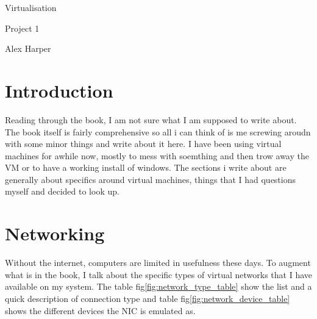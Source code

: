 \documentclass[12pt]{article}
\begin{document}
\begin{titlepage}
	\centering
	{\Huge Virtualisation\par}
	\vspace{0.25in}
	{\Large Project 1\par}
	\vspace{2in}
	{Alex Harper\par}
	\newpage
\end{titlepage}

\tableofcontents
\newpage

\listoffigures
\newpage
\setlength{\parindent}{4em} %
\setlength{\parskip}{1em} %


\section{Introduction}

Reading through the book, I am not sure what I am supposed to write about.
The book itself is fairly comprehensive so all i can think of is me screwing aroudn with some minor things and write about it here.
I have been using virtual machines for awhile now, mostly to mess with soemthing and then trow away the VM or to have a working install of windows.
The sections i write about are generally about specifics around virtual machines, things that I had questions myself and decided to look up.

\section{Networking}

Without the internet, computers are limited in usefulness these days.
To augment what is in the book, I talk about the specific types of virtual networks that I have available on my system.
The table fig\ref{fig:network_type_table} show the list and a quick description of connection type and table fig\ref{fig:network_device_table} shows the different devices the NIC is emulated as.
\end{document}
